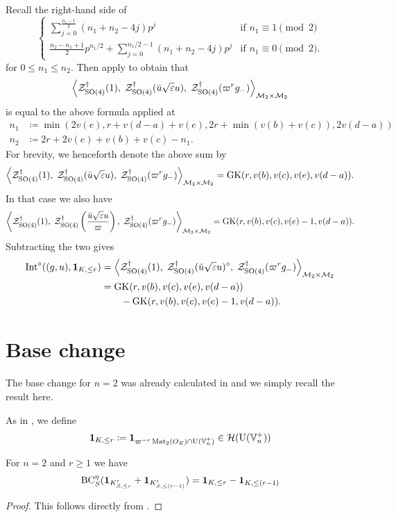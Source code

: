 Recall the right-hand side of
\[
  \begin{cases}
    \sum_{j=0}^{\frac{n_1-1}{2}} (n_1+n_2-4j) p^j & \text{if } n_1 \equiv 1 \pmod 2 \\
    \frac{n_2-n_1+1}{2} p^{n_1/2} + \sum_{j=0}^{n_1/2-1} (n_1+n_2-4j) p^j & \text{if } n_1 \equiv 0 \pmod 2.
  \end{cases}
\]
for $0 \le n_1 \le n_2$.
Then apply  to obtain that
\[
  \left< \mathcal Z^{\dagger}_{\operatorname{SO}(4)}(1), \;
    \mathcal Z^{\dagger}_{\operatorname{SO}(4)}(\bar u \sqrt{\varepsilon} u), \;
    \mathcal Z^{\dagger}_{\operatorname{SO}(4)}(\varpi^r g_-) \right>_{\mathcal M_2 \times \mathcal M_2}
\]
is equal to the above formula applied at
\begin{align*}
  n_1 &\coloneqq \min(2v(e), r+v(d-a)+v(e), 2r+\min(v(b)+v(c)), 2v(d-a)) \\
  n_2 &\coloneqq 2r + 2v(e) + v(b) + v(c) - n_1.
\end{align*}
For brevity, we henceforth denote the above sum by
\[ \left< \mathcal Z^{\dagger}_{\operatorname{SO}(4)}(1), \;
    \mathcal Z^{\dagger}_{\operatorname{SO}(4)}(\bar u \sqrt{\varepsilon} u), \;
    \mathcal Z^{\dagger}_{\operatorname{SO}(4)}(\varpi^r g_-) \right>_{\mathcal M_2 \times \mathcal M_2}
  = \operatorname{GK}(r, v(b), v(c), v(e), v(d-a)). \]
In that case we also have
\[ \left< \mathcal Z^{\dagger}_{\operatorname{SO}(4)}(1), \;
    \mathcal Z^{\dagger}_{\operatorname{SO}(4)}\left(\frac{\bar u \sqrt{\varepsilon} u}{\varpi}\right), \;
    \mathcal Z^{\dagger}_{\operatorname{SO}(4)}(\varpi^r g_-) \right>_{\mathcal M_2 \times \mathcal M_2}
  = \operatorname{GK}(r, v(b), v(c), v(e)-1, v(d-a)). \]
Subtracting the two gives
\begin{align*}
  \operatorname{Int}^\circ((g,u), \mathbf{1}_{K, \le r}) &=
    \left< \mathcal Z^{\dagger}_{\operatorname{SO}(4)}(1), \;
      \mathcal Z^{\dagger}_{\operatorname{SO}(4)}(\bar u \sqrt{\varepsilon} u)^\circ, \;
      \mathcal Z^{\dagger}_{\operatorname{SO}(4)}(\varpi^r g_-) \right>_{\mathcal M_2 \times \mathcal M_2} \\
  &= \operatorname{GK}(r, v(b), v(c), v(e), v(d-a)) \\
  &\qquad- \operatorname{GK}(r, v(b), v(c), v(e)-1, v(d-a)).
\end{align*}

\section{Base change}
The base change for $n=2$ was already calculated in \cite{ref:AFLspherical}
and we simply recall the result here.

As in , we define
\[ \mathbf{1}_{K, \le r} \coloneqq \mathbf{1}_{\varpi^{-r} \operatorname{Mat}_2(O_E) \cap \operatorname{U}(\mathbb V_n^+)} \in \mathcal H(\operatorname{U}(\mathbb V_n^+)) \]
\begin{lemma}
  \label{lem:finale_base_change}
  For $n = 2$ and $r \ge 1$ we have
  \[
    \operatorname{BC}_S^{\eta}(
      \mathbf{1}_{K'_{S, \le r}}
      + \mathbf{1}_{K'_{S, \le (r-1)}}
      ) = \mathbf{1}_{K, \le r} - \mathbf{1}_{K, \le (r-1)}
  \]
\end{lemma}
\begin{proof}
  This follows directly from \cite[equation (7.1.9)]{ref:AFLspherical}.
\end{proof}

